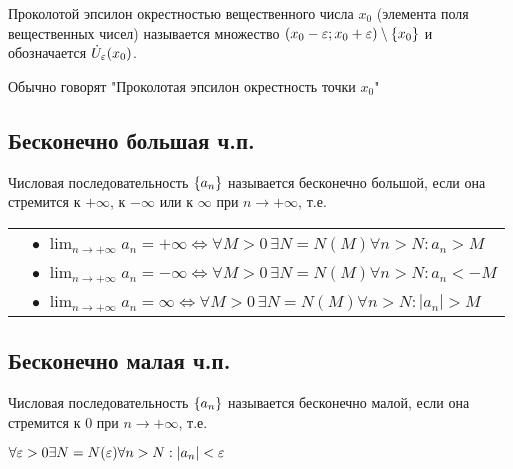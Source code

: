 
{
    Проколотой эпсилон окрестностью вещественного числа $ x_0 $ (элемента поля вещественных чисел)
    называется множество $ (x_0 - \varepsilon; x_0 + \varepsilon) \setminus \{ x_0 \} $ и обозначается $ \dot{U}_{\varepsilon}(x_0) $.

    Обычно говорят "Проколотая эпсилон окрестность точки $ x_0 $"
}



\subsection{Бесконечно большая ч.п.}

{
    Числовая последовательность $ \{ a_n \} $ называется бесконечно большой, если она стремится к $ +\infty$, к $ -\infty $ или к $ \infty $ при $ n \to +\infty $, т.е.

\begin{tabular}{rl}
    & $\bullet$
        $ \lim_{n \to +\infty} a_n = +\infty \iff
        \forall M > 0 \, \exists N = N(M) \forall n > N: a_n > M $ \\
    & $\bullet$
        $ \lim_{n \to +\infty} a_n = -\infty \iff
        \forall M > 0 \, \exists N = N(M) \forall n > N: a_n < -M $ \\
    & $\bullet$
        $ \lim_{n \to +\infty} a_n = \infty \iff
        \forall M > 0 \, \exists N = N(M) \forall n > N: | a_n | > M $ \\
\end{tabular}
}


\subsection{Бесконечно малая ч.п.}

{
    Числовая последовательность $ \{ a_n \} $ называется бесконечно малой, если она стремится к 0 при $ n \to +\infty $, т.е.

    $ \forall \varepsilon > 0 \exists N = N(\varepsilon) \forall n > N: | a_n | < \varepsilon $
}

